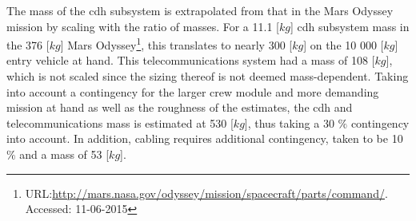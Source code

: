 The mass of the \gls{cdh} subsystem is extrapolated from that in the Mars Odyssey mission by scaling with the ratio of masses. For a 11.1 [$kg$] \gls{cdh} subsystem mass in the 376 [$kg$] Mars Odyssey\footnote{URL:\url{http://mars.nasa.gov/odyssey/mission/spacecraft/parts/command/}. Accessed: 11-06-2015}, this translates to nearly 300 [$kg$] on the 10 000 [$kg$] entry vehicle at hand. This telecommunications system had a mass of 108 [$kg$], which is not scaled since the sizing thereof is not deemed mass-dependent. Taking into account a contingency for the larger crew module and more demanding mission at hand as well as the roughness of the estimates, the \gls{cdh} and telecommunications mass is estimated at 530 [$kg$], thus taking a 30 $\%$ contingency into account. In addition, cabling requires additional contingency, taken to be 10 $\%$ and a mass of 53 [$kg$].

